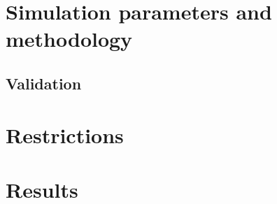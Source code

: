 \section{Simulation parameters and methodology}
\label{section:parameters}

\subsection{Validation}

\section{Restrictions}
\label{section:restrictions}

\section{Results}
\label{section:results}